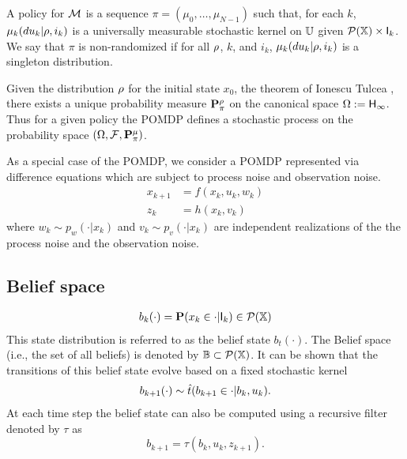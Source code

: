 \documentclass{ifacconf}
\begin{document}
\begin{definition}
	A policy for $\MDP$ is a sequence $\pi=(\mu_0,\ldots,\mu_{N-1})$ such that, for each $k$, $\mu_k(du_k|\init, i_k)$ is a universally measurable stochastic kernel on $\U$  given $\mathcal{P}(\X)\times \I_k$.
	We say that $\pi$ is non-randomized if for all $\init$, $k$, and $i_k$,    $\mu_k(du_k|\init, i_k)$ is a singleton distribution.
\end{definition}
 Given the distribution $\init$ for the initial state $x_0$,  the theorem of Ionescu Tulcea \citep{hll1996}, there exists a unique probability measure $\P_\pi^\init$ on the canonical space $\Omega:=\Hist_\infty$. Thus for a given policy the POMDP defines a stochastic process on the probability space  
 $(\Omega,\mathcal F,\P_\pi^\mu)$.
\begin{example}
	As a special case of the POMDP, we consider a POMDP represented via difference equations which are subject to process noise and observation noise.
\begin{align*}
x_{k+1}&=f(x_k,u_k,w_k)\\
z_k&=h(x_k,v_k)
\end{align*}
where $w_k\sim p_w(\cdot|x_k)$ and $v_k\sim p_v(\cdot|x_k)$ are independent realizations of the the process noise and the observation noise.


\end{example}

 \subsection{Belief space}
\begin{align}
	b_k(\cdot)=\P(x_k\in \cdot|\I_k)\in \mathcal P (\X)
\end{align}
This state distribution is referred to as the belief state $b_t(\cdot)$. 
The Belief space (i.e., the set of all beliefs) is denoted by $\mathbb{B}\subset \mathcal P(\X)$.
It can be shown that the transitions of this belief state evolve based on a fixed stochastic kernel
\begin{align}
	 b_{k+1}(\cdot)\sim \trb(b_{k+1}\in \cdot|b_k,u_k).
\end{align}
At each time step the belief state can also be computed using a 
recursive filter denoted by $\tau$ as 
\[b_{k+1}=\tau(b_k,u_k,z_{k+1}).\]
\end{document}
